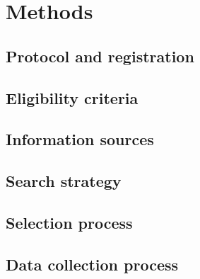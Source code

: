 \section{Methods}

\subsection{Protocol and registration}

\subsection{Eligibility criteria}

\subsection{Information sources}

\subsection{Search strategy}

\subsection{Selection process}

\subsection{Data collection process}

